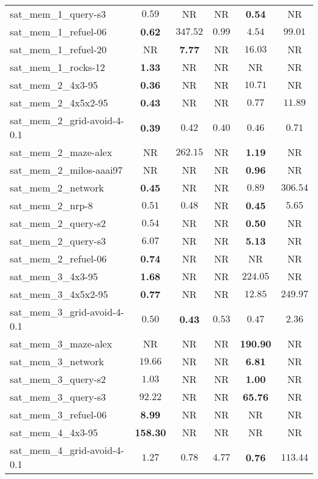 \begin{tabular}{lccccc}
sat\_mem\_1\_query-s3 & $0.59$ & NR & NR & \textbf{0.54} & NR \\
sat\_mem\_1\_refuel-06 & \textbf{0.62} & $347.52$ & $0.99$ & $4.54$ & $99.01$ \\
sat\_mem\_1\_refuel-20 & NR & \textbf{7.77} & NR & $16.03$ & NR \\
sat\_mem\_1\_rocks-12 & \textbf{1.33} & NR & NR & NR & NR \\
sat\_mem\_2\_4x3-95 & \textbf{0.36} & NR & NR & $10.71$ & NR \\
sat\_mem\_2\_4x5x2-95 & \textbf{0.43} & NR & NR & $0.77$ & $11.89$ \\
sat\_mem\_2\_grid-avoid-4-0.1 & \textbf{0.39} & $0.42$ & $0.40$ & $0.46$ & $0.71$ \\
sat\_mem\_2\_maze-alex & NR & $262.15$ & NR & \textbf{1.19} & NR \\
sat\_mem\_2\_milos-aaai97 & NR & NR & NR & \textbf{0.96} & NR \\
sat\_mem\_2\_network & \textbf{0.45} & NR & NR & $0.89$ & $306.54$ \\
sat\_mem\_2\_nrp-8 & $0.51$ & $0.48$ & NR & \textbf{0.45} & $5.65$ \\
sat\_mem\_2\_query-s2 & $0.54$ & NR & NR & \textbf{0.50} & NR \\
sat\_mem\_2\_query-s3 & $6.07$ & NR & NR & \textbf{5.13} & NR \\
sat\_mem\_2\_refuel-06 & \textbf{0.74} & NR & NR & NR & NR \\
sat\_mem\_3\_4x3-95 & \textbf{1.68} & NR & NR & $224.05$ & NR \\
sat\_mem\_3\_4x5x2-95 & \textbf{0.77} & NR & NR & $12.85$ & $249.97$ \\
sat\_mem\_3\_grid-avoid-4-0.1 & $0.50$ & \textbf{0.43} & $0.53$ & $0.47$ & $2.36$ \\
sat\_mem\_3\_maze-alex & NR & NR & NR & \textbf{190.90} & NR \\
sat\_mem\_3\_network & $19.66$ & NR & NR & \textbf{6.81} & NR \\
sat\_mem\_3\_query-s2 & $1.03$ & NR & NR & \textbf{1.00} & NR \\
sat\_mem\_3\_query-s3 & $92.22$ & NR & NR & \textbf{65.76} & NR \\
sat\_mem\_3\_refuel-06 & \textbf{8.99} & NR & NR & NR & NR \\
sat\_mem\_4\_4x3-95 & \textbf{158.30} & NR & NR & NR & NR \\
sat\_mem\_4\_grid-avoid-4-0.1 & $1.27$ & $0.78$ & $4.77$ & \textbf{0.76} & $113.44$ \\

\end{tabular}
